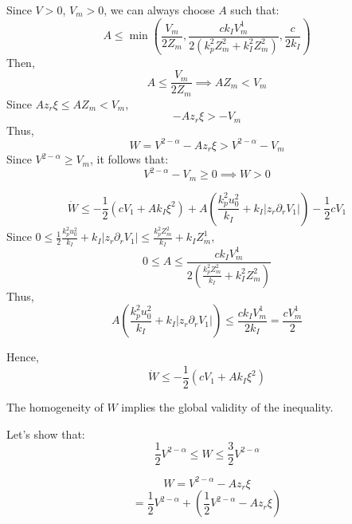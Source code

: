 Since \(V > 0\), \(V_m > 0\), we can always choose \(A\) such that:
\begin{equation}
A \leq \min \left( \frac{V_m}{2 Z_m}, \frac{c k_I V_m^{1}}{2 \left( k_p^2 Z_m^2 + k_I^2 Z_m^2 \right)}, \frac{c}{2 k_I} \right)
\end{equation}
Then,
\begin{equation}
A \leq \frac{V_m}{2 Z_m} \implies A Z_m < V_m
\end{equation}
Since \(A z_r \xi \leq A Z_m < V_m\),
\begin{equation}
- A z_r \xi > -V_m
\end{equation}
Thus,
\begin{equation}
W = V^{2-\alpha} - A z_r \xi > V^{2-\alpha} - V_m
\end{equation}
Since \(V^{2-\alpha} \geq V_m\), it follows that:
\begin{equation}
V^{2-\alpha} - V_m \geq 0 \implies W > 0
\end{equation}

\begin{equation}
\dot{W} \leq -\frac{1}{2} \left( c V_1 + A k_I \xi^2 \right) + A \left( \frac{k_p^2 u_0^2}{k_I} + k_I |z_r \partial_r V_1| \right) - \frac{1}{2} c V_1
\end{equation}
Since \(0 \leq \frac{1}{2} \frac{k_p^2 u_0^2}{k_I} + k_I |z_r \partial_r V_1| \leq \frac{k_p^2 Z_m^2}{k_I} + k_I Z_m^1\),
\begin{equation}
0 \leq A \leq \frac{c k_I V_m^{1}}{2 \left( \frac{k_p^2 Z_m^2}{k_I} + k_I^2 Z_m^2 \right)}
\end{equation}
Thus,
\begin{equation}
A \left( \frac{k_p^2 u_0^2}{k_I} + k_I |z_r \partial_r V_1| \right) \leq \frac{c k_I V_m^{1}}{2k_I} = \frac{c V_m^1}{2}
\end{equation}


Hence,
\begin{equation}
\dot{W} \leq -\frac{1}{2} \left( c V_1 + A k_I \xi^2 \right)
\end{equation}

The homogeneity of \(W\) implies the global validity of the inequality.


Let's show that:
\begin{equation}
\frac{1}{2} V^{2-\alpha} \leq W \leq \frac{3}{2} V^{2-\alpha}
\end{equation}


\begin{equation}
W = V^{2-\alpha} - A z_r \xi
\end{equation}
\begin{equation}
= \frac{1}{2} V^{2-\alpha} + \left( \frac{1}{2} V^{2-\alpha} - A z_r \xi \right)
\end{equation}

